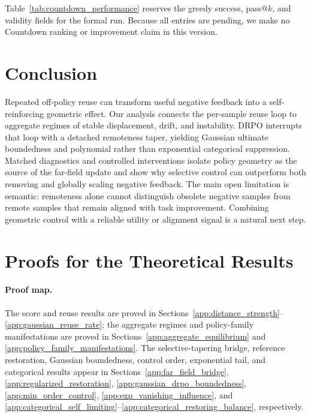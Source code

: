 Table~\ref{tab:countdown_performance} reserves the greedy success,
pass@$k$, and validity fields for the formal run. Because all entries are
pending, we make no Countdown ranking or improvement claim in this
version.

\section{Conclusion}

Repeated off-policy reuse can transform useful negative feedback into a
self-reinforcing geometric effect. Our analysis connects the per-sample reuse
loop to aggregate regimes of stable displacement, drift, and instability.
DRPO interrupts that loop with a detached remoteness taper, yielding Gaussian
ultimate boundedness and polynomial rather than exponential categorical
suppression. Matched diagnostics and controlled interventions isolate policy
geometry as the source of the far-field update and show why selective control
can outperform both removing and globally scaling negative feedback. The main
open limitation is semantic: remoteness alone cannot distinguish obsolete
negative samples from remote samples that remain aligned with task improvement.
Combining geometric control with a reliable utility or alignment signal is a
natural next step.







\newpage
\appendix
\onecolumn
\section{Proofs for the Theoretical Results}
\label{app:theory_proofs}

\paragraph{Proof map.}
The score and reuse results are proved in
Sections~\ref{app:distance_strength}--\ref{app:gaussian_reuse_rate}; the
aggregate regimes and policy-family manifestations are proved in
Sections~\ref{app:aggregate_equilibrium} and
\ref{app:policy_family_manifestations}. The selective-tapering bridge,
reference restoration, Gaussian boundedness, control order, exponential tail,
and categorical results appear in Sections~\ref{app:far_field_bridge},
\ref{app:regularized_restoration}, \ref{app:gaussian_drpo_boundedness},
\ref{app:min_order_control}, \ref{app:exp_vanishing_influence}, and
\ref{app:categorical_self_limiting}--\ref{app:categorical_restoring_balance},
respectively.

